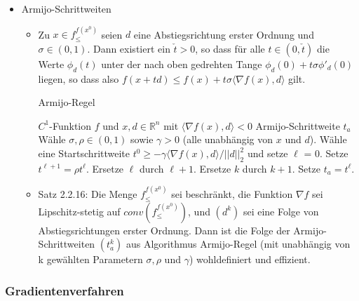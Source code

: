 \documentclass[paper=a4, fontsize=11pt]{scrartcl} %
\numberwithin{equation}{section} %
\numberwithin{figure}{section} %
\numberwithin{table}{section} %
\begin{document}
\begin{itemize}
\begin{itemize}
\end{itemize}
\item Armijo-Schrittweiten
\begin{itemize}
\item Zu $x \in f^{f(x^0)}_\le$ seien $d$ eine Abstiegsrichtung erster Ordnung und $\sigma \in (0,1)$. Dann existiert ein $\check{t} > 0$, so dass für alle $t \in (0,\check{t})$ die Werte $\phi_d(t)$ unter der nach oben gedrehten Tange $\phi_d(0) + t \sigma \phi'_d(0)$ liegen, so dass also $f(x + td) \le f(x) + t \sigma \langle \nabla f(x),d \rangle$ gilt.
\begin{algorithm}
\caption{Armijo-Regel}
\begin{algorithmic}[1]
  \Require $C^1$-Funktion $f$ und $x,d \in \mathbb{R}^n$ mit $\langle \nabla f(x),d\rangle < 0$
  \Ensure Armijo-Schrittweite $t_a$
  \State Wähle $\sigma, \rho \in (0,1)$ sowie $\gamma > 0$ (alle unabhängig von $x$ und $d$).
  \State Wähle eine Startschrittweite $t^0 \ge - \gamma \langle \nabla f(x),d \rangle / ||d||^2_2$ und setze $\ell$ = 0.
  \State Setze $t^{\ell+1} = \rho t^{\ell}$.
  \State Ersetze $\ell$ durch $\ell + 1$.
  \State Ersetze $k$ durch $k+1$.
  \EndWhile
  \State Setze $t_a = t^{\ell}$.
\end{algorithmic}
\end{algorithm}
\item Satz 2.2.16: Die Menge $f^{f(x^0)}_\le$ sei beschränkt, die Funktion $\nabla f$ sei Lipschitz-stetig auf $conv(f^{f(x^0)}_\le)$, und $(d^k)$ sei eine Folge von Abstiegsrichtungen erster Ordnung. Dann ist die Folge der Armijo-Schrittweiten $(t_a^k)$ aus Algorithmus Armijo-Regel (mit unabhängig von k gewählten Parametern $\sigma, \rho$ und $\gamma$) wohldefiniert und effizient.
\end{itemize}
\end{itemize}

\subsubsection{Gradientenverfahren}
\end{document}
